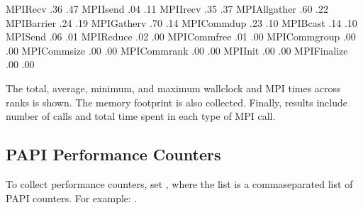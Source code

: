 \documentclass[letterpaper,10pt,english]{sphinxmanual}
\begin{document}
\begin{sphinxVerbatim}[commandchars=\\\{\}]
MPI\PYGZus{}Recv                     .36                       .47
MPI\PYGZus{}Isend                    .04                   .11
MPI\PYGZus{}Irecv                     .35                   .37
MPI\PYGZus{}Allgather                 .60                       .22
MPI\PYGZus{}Barrier                   .24                       .19
MPI\PYGZus{}Gatherv                   .70                       .14
MPI\PYGZus{}Comm\PYGZus{}dup                  .23                       .10
MPI\PYGZus{}Bcast                     .14                       .10
MPI\PYGZus{}Send                      .06                       .01
MPI\PYGZus{}Reduce                    .02                       .00
MPI\PYGZus{}Comm\PYGZus{}free                 .01                       .00
MPI\PYGZus{}Comm\PYGZus{}group                .00                       .00
MPI\PYGZus{}Comm\PYGZus{}size                 .00                       .00
MPI\PYGZus{}Comm\PYGZus{}rank                 .00                       .00
MPI\PYGZus{}Init                      .00                       .00
MPI\PYGZus{}Finalize                  .00                       .00
\end{sphinxVerbatim}

\sphinxAtStartPar
The total, average, minimum, and maximum wallclock and MPI times across ranks
is shown.  The memory footprint is also collected.  Finally, results include
number of calls and total time spent in each type of MPI call.


\subsection{PAPI Performance Counters}
\label{\detokenize{External_Profiling_Tools:papi-performance-counters}}
\sphinxAtStartPar
To collect performance counters, set , where the list is a
comma\sphinxhyphen{}separated list of PAPI counters. For example: .
\end{document}
